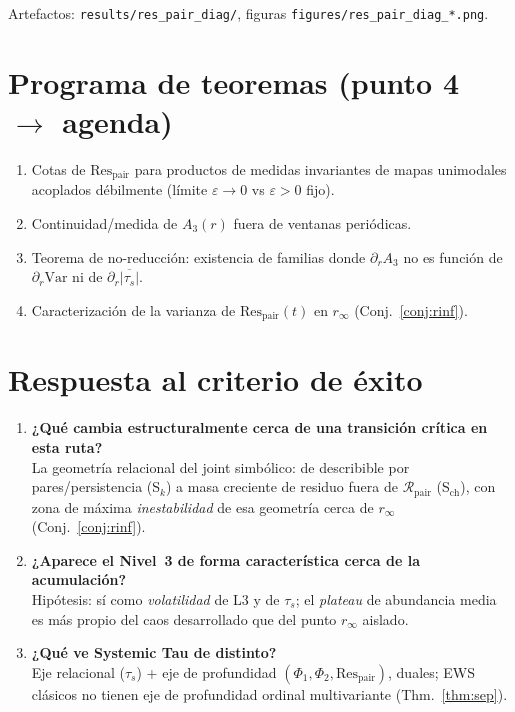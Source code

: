 \documentclass[11pt,a4paper]{article}
\theoremstyle{definition}
\theoremstyle{plain}
\theoremstyle{remark}
\newcommand{\Res}{\mathrm{Res}}
\newcommand{\Rpair}{\mathcal{R}_{\mathrm{pair}}}
\newcommand{\ts}{\tau_s}
\begin{document}
Artefactos: \texttt{results/res\_pair\_diag/}, figuras
\texttt{figures/res\_pair\_diag\_*.png}.

\section{Programa de teoremas (punto 4 $\to$ agenda)}
\label{sec:program}

\begin{enumerate}[label=\textbf{T4.\arabic*.}]
  \item Cotas de $\Res_{\mathrm{pair}}$ para productos de medidas
  invariantes de mapas unimodales acoplados d\'ebilmente (l\'imite
  $\varepsilon\to 0$ vs $\varepsilon>0$ fijo).
  \item Continuidad/medida de $A_3(r)$ fuera de ventanas peri\'odicas.
  \item Teorema de no-reducci\'on: existencia de familias donde
  $\partial_r A_3$ no es funci\'on de $\partial_r\mathrm{Var}$ ni de
  $\partial_r\overline{|\ts|}$.
  \item Caracterizaci\'on de la varianza de $\Res_{\mathrm{pair}}(t)$ en
  $r_\infty$ (Conj.~\ref{conj:rinf}).
\end{enumerate}

\section{Respuesta al criterio de \'exito}
\label{sec:ans}

\begin{enumerate}[label=\textbf{Q\arabic*.}, leftmargin=*]
  \item \textbf{¿Qu\'e cambia estructuralmente cerca de una transici\'on
  cr\'itica en esta ruta?}\\
  La geometr\'ia relacional del joint simb\'olico: de describible por
  pares/persistencia (S$_k$) a masa creciente de residuo fuera de
  $\Rpair$ (S$_{\mathrm{ch}}$), con zona de m\'axima
  \emph{inestabilidad} de esa geometr\'ia cerca de $r_\infty$
  (Conj.~\ref{conj:rinf}).

  \item \textbf{¿Aparece el Nivel~3 de forma caracter\'istica cerca de
  la acumulaci\'on?}\\
  Hip\'otesis: s\'i como \emph{volatilidad} de L3 y de $\ts$; el
  \emph{plateau} de abundancia media es m\'as propio del caos
  desarrollado que del punto $r_\infty$ aislado.

  \item \textbf{¿Qu\'e ve Systemic Tau de distinto?}\\
  Eje relacional ($\ts$) + eje de profundidad
  $(\Phi_1,\Phi_2,\Res_{\mathrm{pair}})$, duales; EWS cl\'asicos no
  tienen eje de profundidad ordinal multivariante
  (Thm.~\ref{thm:sep}).
\end{enumerate}
\end{document}
